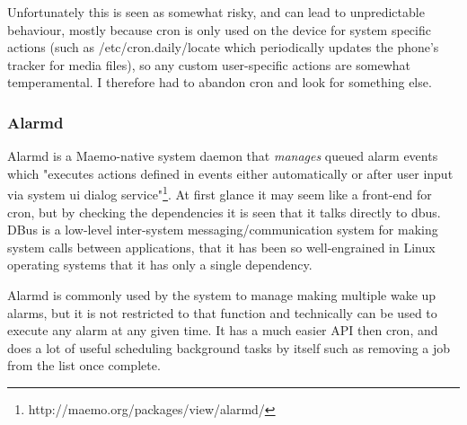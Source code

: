 \documentclass[11pt]{article} %
\begin{document}
Unfortunately this is seen as somewhat risky, and can lead to unpredictable behaviour, mostly because cron is only used on the device for system specific actions (such as /etc/cron.daily/locate which periodically updates the phone's tracker for media files), so any custom user-specific actions are somewhat temperamental.  I therefore had to abandon cron and look for something else.

\subsubsection{Alarmd}
Alarmd is a Maemo-native system daemon that {\it manages} queued alarm events which "executes actions defined in events either automatically or after user input via system ui dialog service"\footnote{http://maemo.org/packages/view/alarmd/}. At first glance it may seem like a front-end for cron, but by checking the dependencies it is seen that it talks directly to dbus. DBus is a low-level inter-system messaging/communication system for making system calls between applications, that it has been so well-engrained in Linux operating systems that it has only a single dependency.

Alarmd is commonly used by the system to manage making multiple wake up alarms, but it is not restricted to that function and technically can be used to execute any alarm at any given time. It has a much easier API then cron, and does a lot of useful scheduling background tasks by itself such as removing a job from the list once complete. 
\end{document}
